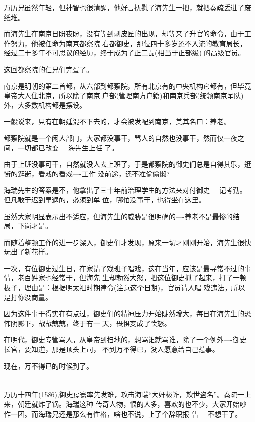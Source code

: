\documentclass[11pt,a4paper,onecolumn]{article}
\begin{document}
万历兄虽然年轻，但神智也很清醒，他好言抚慰了海先生一把，就把奏疏丢进了废纸堆。

而海先生在南京日盼夜盼，没有等到剥皮匠的出现，却等来了升官的命令，由于工作努力，他被任命为南京都察院
右都御史，那位四十多岁还不入流的教育局长，经过二十多年不可思议的经历，终于成为了正二品(相当于正部级)
的高级官员。

这回都察院的仁兄们完蛋了。

南京是明朝的第二首都，从六部到都察院，所有北京有的中央机构它都有，但毕竟皇帝大人住北京，所以除了南京
户部(管理南方户籍)和南京兵部(统领南京军队)外，大多数机构都是摆设。

一般说来，只有在朝廷混不下去的，才会被发配到南京，美其名曰：养老。

都察院就是一个闲人部门，大家都没事干，骂人的自然也没事干，然而仅一夜之间，一切都已改变----海先生上任
了。

由于上班没事可干，自然就没人去上班了，于是都察院的御史们总是自得其乐，逛街的逛街，看戏的看戏----工作
没前途，还不准偷偷懒?

海瑞先生的答案是不，他拿出了三十年前治理学生的方法来对付御史----记考勤。但凡敢于迟到早退的，必须到单
位，哪怕没事干，也得坐在这里。

虽然大家明显表示出不适应，但海先生的威胁是很明确的----养老不是最惨的结局，下岗才是。

而随着整顿工作的进一步深入，御史们才发现，原来一切才刚刚开始，海先生很快玩出了新花样。

一次，有位御史过生日，在家请了戏班子唱戏，这在当年，应该是最寻常不过的事情，老百姓家也经常干，但海先
生却勃然大怒，把这位御史抓了起来，打了一顿板子，理由是：根据明太祖时期律令(注意这个日期)，官员请人唱
戏违法，所以是打你没商量。

因为这件事干得实在有点过，御史们的精神压力开始陡然增大，每日在海先生的恐怖阴影下，战战兢兢，终于有一
天，畏惧变成了愤怒。

在明代，御史专管骂人，从皇帝到扫地的，想骂谁就骂谁，除了一个例外----御史长官，要知道，那是顶头上司，
不到万不得已，没人愿意给自己惹事。

现在，万不得已的时候到了。

\section[\thesection]{}

万历十四年(1586),御史房寰率先发难，攻击海瑞``大奸极诈，欺世盗名''。奏疏一上来，朝廷就炸了锅。海瑞这种
传奇人物，恨的人多，喜欢的也不少，大家开始吵作一团。而海瑞兄还是那么有性格，啥也不说，上了个辞职报
告----不想干了。
\end{document}
